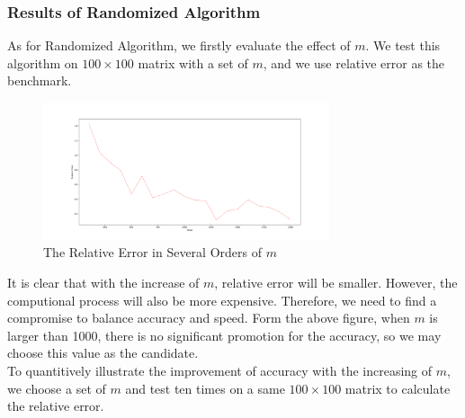 \documentclass{article}
\begin{document}
\subsubsection{Results of Randomized Algorithm}
As for Randomized Algorithm, we firstly evaluate the effect of $m$. We test this algorithm on $100\times 100$ matrix with a set of $m$, and we use relative error as the benchmark.
  \begin{figure}[H]
	\begin{center}
		\includegraphics[width=0.75\textwidth]{ran_log_det}
	\end{center}
	\caption{The Relative Error in Several Orders of $m$}
	\label{fig9}
\end{figure}
It is clear that with the increase of $m$, relative error will be smaller. However, the computional process will also be more expensive. Therefore, we need to find a compromise to balance accuracy and speed. Form the above figure, when $m$ is larger than 1000, there is no significant promotion for the accuracy, so we may choose this value as the candidate.\\
To quantitively illustrate the improvement of accuracy with the increasing of $m$, we choose a set of $m$ and test ten times on a same $100\times 100$ matrix to calculate the relative error.
\end{document}
